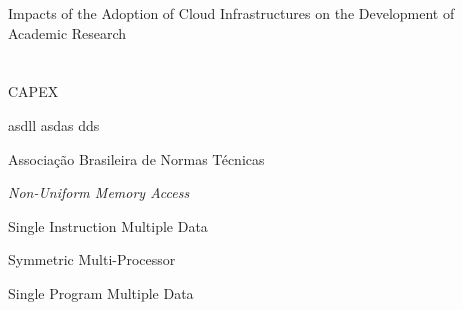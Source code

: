\documentclass[tese,capa]{texufpel}
\begin{document}
\begin{englishabstract}{Impacts of the Adoption of Cloud Infrastructures on the Development of Academic Research}
\end{englishabstract}

\listoffigures

\listoftables

\chapter*{\listabbrvname}


\begin{listofabbrv}{CAPEX}%
        \item[CAPEX] asdll asdas dds
        \item[\textbf{ABNT}] Associação Brasileira de Normas Técnicas
        \item[NUMA] \textit{Non-Uniform Memory Access}
        \item[SIMD] Single Instruction Multiple Data
        \item[SMP] Symmetric Multi-Processor
        \item[SPMD] Single Program Multiple Data
\end{listofabbrv}

\listoftodos %

\tableofcontents
\end{document}
